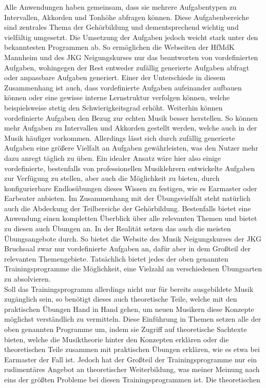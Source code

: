 Alle Anwendungen haben gemeinsam, dass sie mehrere Aufgabentypen zu Intervallen, Akkorden und Tonhöhe abfragen können. Diese Aufgabenbereiche sind zentrales Thema der Gehörbildung und dementsprechend wichtig und vielfältig umgesetzt. 
Die Umsetzung der Aufgaben jedoch weicht stark unter den bekanntesten Programmen ab. So ermöglichen die Webseiten der HfMdK Mannheim und des JKG Neigungskurses nur das beantworten von vordefinierten Aufgaben, wohingegen der Rest entweder zufällig generierte Aufgaben abfragt oder anpassbare Aufgaben generiert.
Einer der Unterschiede in diesem Zusammenhang ist auch, dass vordefinierte Aufgaben aufeinander aufbauen können oder eine gewisse interne Lernstruktur verfolgen können, welche beispielsweise stetig den Schwierigkeitsgrad erhöht. Weiterhin können vordefinierte Aufgaben den Bezug zur echten Musik besser herstellen. So können mehr Aufgaben zu Intervallen und Akkorden gestellt werden, welche auch in der Musik häufiger vorkommen. Allerdings lässt sich durch zufällig generierte Aufgaben eine größere Vielfalt an Aufgaben gewährleisten, was den Nutzer mehr dazu anregt täglich zu üben. Ein idealer Ansatz wäre hier also einige vordefinierte, bestenfalls von professionellen Musiklehrern entwickelte Aufgaben zur Verfügung zu stellen, aber auch die Möglichkeit zu bieten, durch konfigurierbare Endlosübungen dieses Wissen zu festigen, wie es Earmaster  oder Earbeater anbieten. Im Zusammenhang mit der Übungsvielfalt steht natürlich auch die Abdeckung der Teilbereiche der Gehörbildung. Bestenfalls bietet eine Anwendung einen kompletten Überblick über alle relevanten Themen und bietet zu diesen auch Übungen an. In der Realität setzen das auch die meisten Übungsangebote durch. So bietet die Website des Musik Neigungskurses der JKG Bruchsaal zwar nur vordefinierte Aufgaben an, dafür aber in dem Großteil der relevanten Themengebiete. Tatsächlich bietet jedes der oben genannten Trainingsprogramme die Möglichkeit, eine Vielzahl an verschiedenen Übungsarten zu absolvieren.  \\
Soll das Trainingsprogramm allerdings nicht nur für bereits ausgebildete Musik zugänglich sein, so benötigt dieses auch theoretische Teile, welche mit den praktischen Übungen Hand in Hand gehen, um neuen Musikern diese Konzepte möglichst verständlich zu vermitteln. Diese Einführung in Themen setzen alle der oben genannten Programme um, indem sie Zugriff auf theoretische Sachtexte bieten, welche
die Musiktheorie hinter den Konzepten erklären oder die theoretischen Teile zusammen mit praktischen Übungen erklären, wie es etwa bei Earmaster der Fall ist. Jedoch hat der Großteil der Trainingsprogramme nur ein rudimentäres Angebot an theoretischer Weiterbildung, was meiner Meinung nach eins der größten Probleme bei diesen Trainingsprogrammen ist. Die theoretischen 
